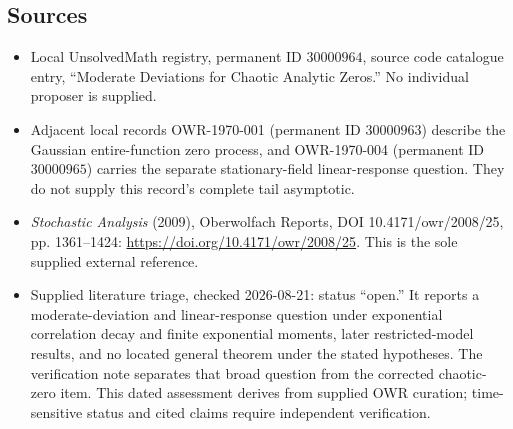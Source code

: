 \documentclass[11pt]{article}
\begin{document}
\subsection{Sources}
\begin{itemize}
\item Local UnsolvedMath registry, permanent ID \(30000964\), source code catalogue entry, ``Moderate Deviations for Chaotic Analytic Zeros.'' No individual proposer is supplied.
\item Adjacent local records OWR-1970-001 (permanent ID \(30000963\)) describe the Gaussian entire-function zero process, and OWR-1970-004 (permanent ID \(30000965\)) carries the separate stationary-field linear-response question. They do not supply this record's complete tail asymptotic.
\item \emph{Stochastic Analysis} (2009), Oberwolfach Reports, DOI 10.4171/owr/2008/25, pp. 1361--1424: \url{https://doi.org/10.4171/owr/2008/25}. This is the sole supplied external reference.
\item Supplied literature triage, checked 2026-08-21: status ``open.'' It reports a moderate-deviation and linear-response question under exponential correlation decay and finite exponential moments, later restricted-model results, and no located general theorem under the stated hypotheses. The verification note separates that broad question from the corrected chaotic-zero item. This dated assessment derives from supplied OWR curation; time-sensitive status and cited claims require independent verification.
\end{itemize}
\end{document}
